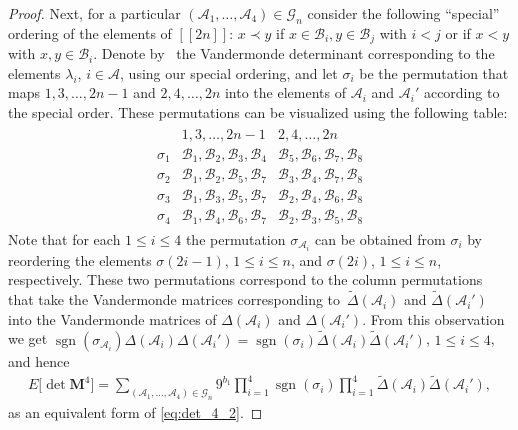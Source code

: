 \documentclass[pdftex]{sigma}
\numberwithin{equation}{section}
\theoremstyle{definition}
\newcommand{\cB}{\mathcal{B}}
\newcommand{\sgn}{\operatorname{sgn}}
\newcommand{\cA}{\mathcal{A}}
\newcommand{\cG}{\mathcal{G}}
\newcommand{\lst}[1]{[\![#1 ]\!]}
\newcommand{\mbf}[1]{\mathbf{#1}}
\newcommand{\wt}[1]{\widetilde{#1}}
\begin{document}
\begin{proof}
Next, for a particular $(\cA_1,\dots, \cA_4)\in \cG_n$ consider the following ``special'' ordering of the elements of $\lst{2n}$: $x\prec y$ if $x\in \cB_i, y\in \cB_j$ with $i<j$ or if $x<y$ with $x,y\in \cB_i$. Denote by~\smash{$\wt \Delta(\cA)$} the Vandermonde determinant corresponding to the elements $\lambda_i$, $i\in \cA$, using our special ordering, and let $\sigma_i$ be the permutation that maps $1,3,\dots, 2n-1$ and $2,4,\dots, 2n$ into the elements of $\cA_i$ and $\cA_i'$ according to the special order. These permutations can be visualized using the following table:
\begin{align*}
 \begin{array}{r|c|c}
 &1,3,\dots,2n-1&2,4,\dots,2n
 \\ \hline
\sigma_1&\cB_1, \cB_2,\cB_3,\cB_4&\cB_5, \cB_6,\cB_7,\cB_8\\
\hline
\sigma_2&\cB_1, \cB_2,\cB_5,\cB_7&\cB_3, \cB_4,\cB_7,\cB_8\\
\hline
\sigma_3&\cB_1, \cB_3,\cB_5,\cB_7&\cB_2, \cB_4,\cB_6,\cB_8\\
\hline
\sigma_4&\cB_1, \cB_4,\cB_6,\cB_7&\cB_2, \cB_3,\cB_5,\cB_8
 \end{array}
\end{align*}
Note that for each $1\le i\le 4$ the permutation $\sigma_{\cA_i}$ can be obtained from $\sigma_{i}$ by reordering the elements $\sigma(2i-1)$, $1\le i\le n$, and $\sigma(2i)$, $1\le i\le n$, respectively. These two permutations correspond to the column permutations that take the Vandermonde matrices corresponding to~$\wt \Delta(\cA_i)$ and $\wt \Delta(\cA_i')$ into the Vandermonde matrices of $\Delta(\cA_i)$ and $\Delta(\cA_i')$. From this observation we get
$
 \sgn(\sigma_{\cA_i})
 \Delta(\cA_i)\Delta(\cA_i')= \sgn(\sigma_i)
 \wt \Delta(\cA_i)\wt \Delta(\cA_i')$, $1\le i\le 4$,
and hence
\begin{align*}\label{eq:det_4_3}
 E\big[ \det \mbf{M}^4\big]=\sum_{(\cA_1,\dots,\cA_4)\in \cG_n} 9^{ b_1}
 \prod_{i=1}^4 \sgn(\sigma_i)
 \prod_{i=1}^4 \wt\Delta(\cA_i)\wt\Delta(\cA_i'),
\end{align*}
as an equivalent form of \eqref{eq:det_4_2}.


\end{proof}
\end{document}
